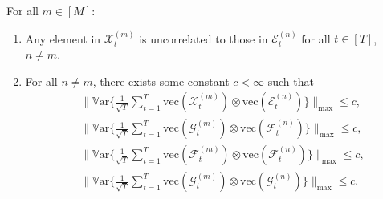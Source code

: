 \documentclass[10pt,a4paper]{amsart}
\def\cE{\mathcal{E}}
\def\cF{\mathcal{F}}
\def\cG{\mathcal{G}} \def\cH{\boldsymbol{\mathcal{H}}} \def\cI{\mathcal{I}}
\def\cX{\mathcal{X}}
\def\var{\mathbb{V}\mathrm{ar}}
\def\vec{\mathrm{vec}}
\begin{document}
\begin{assumption}\label{ass: dependence_moment}
For all $m\in[M]$: 
\begin{enumerate}[itemsep=0pt, label = (\alph*), left = 0pt]
    \item Any element in $\cX_t^{(m)}$ is uncorrelated to those in $\cE_t^{(n)}$ for all $t\in[T]$, $n\neq m$.
    \item For all $n\neq m$, there exists some constant $c<\infty$ such that
    \begin{align*}
    & \Bigg\| \var\Bigg\{ \frac{1}{\sqrt{T}} \sum_{t=1}^T \vec(\cX_t^{(m)}) \otimes \vec(\cE_t^{(n)}) \Bigg\} \Bigg\|_{\max} \leq c , \\
    & \Bigg\| \var\Bigg\{ \frac{1}{\sqrt{T}} \sum_{t=1}^T \vec(\cG_t^{(m)}) \otimes \vec(\cF_t^{(n)}) \Bigg\} \Bigg\|_{\max} \leq c , \\
    & \Bigg\| \var\Bigg\{ \frac{1}{\sqrt{T}} \sum_{t=1}^T \vec(\cF_t^{(m)}) \otimes \vec(\cF_t^{(n)}) \Bigg\} \Bigg\|_{\max} \leq c , \\
    & \Bigg\| \var\Bigg\{ \frac{1}{\sqrt{T}} \sum_{t=1}^T \vec(\cG_t^{(m)}) \otimes \vec(\cG_t^{(n)}) \Bigg\} \Bigg\|_{\max} \leq c .
    \end{align*}
\end{enumerate}
\end{assumption}
\end{document}
